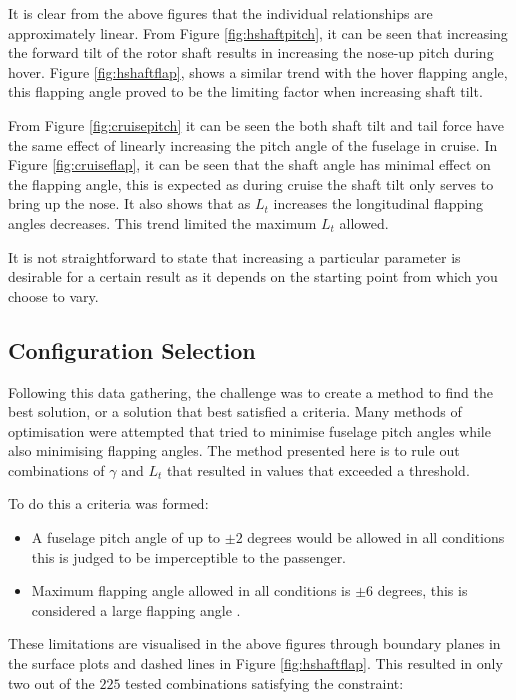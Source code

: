 \documentclass[11pt,a4paper]{article}
\begin{document}
It is clear from the above figures that the individual relationships are approximately linear.
From Figure \ref{fig:hshaftpitch}, it can be seen that increasing the forward tilt of the rotor shaft results in increasing the nose-up pitch during hover. Figure \ref{fig:hshaftflap}, shows a similar trend with the hover flapping angle, this flapping angle proved to be the limiting factor when increasing shaft tilt.

From Figure \ref{fig:cruisepitch} it can be seen the both shaft tilt and tail force have the same effect of linearly increasing the pitch angle of the fuselage in cruise. In Figure \ref{fig:cruiseflap}, it can be seen that the shaft angle has minimal effect on the flapping angle, this is expected as during cruise the shaft tilt only serves to bring up the nose. It also shows that as $L_t$ increases the longitudinal flapping angles decreases. This trend limited the maximum $L_t$ allowed.

It is not straightforward to state that increasing a particular parameter is desirable for a certain result as it depends on the starting point from which you choose to vary.


\subsection{Configuration Selection}


Following this data gathering, the challenge was to create a method to find the best solution, or a solution that best satisfied a criteria. Many methods of optimisation were attempted that tried to minimise fuselage pitch angles while also minimising flapping angles. The method presented here is to rule out combinations of $\gamma$ and $L_t$ that resulted in values that exceeded a threshold.

To do this a criteria was formed:

\begin{itemize}
    \item A fuselage pitch angle of up to $\pm2$ degrees would be allowed in all conditions this is judged to be imperceptible to the passenger.
    \item Maximum flapping angle allowed in all conditions is $\pm6$ degrees, this is considered a large flapping angle \cite{prouty}\cite{padfield}.
\end{itemize}{}

These limitations are visualised in the above figures through boundary planes in the surface plots and dashed lines in Figure \ref{fig:hshaftflap}.
This resulted in only two out of the $225$ tested combinations satisfying the constraint:
\end{document}
